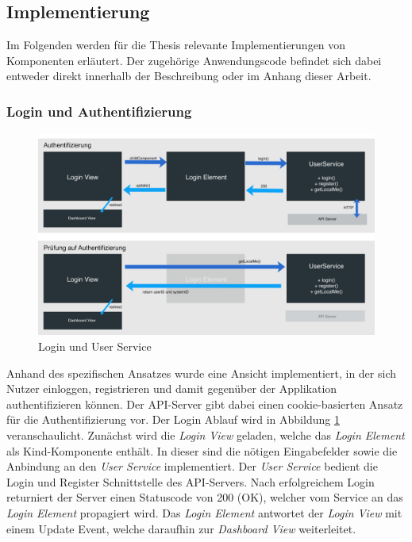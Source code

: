 \subsection{Implementierung}

Im Folgenden werden für die Thesis relevante Implementierungen von Komponenten erläutert.
Der zugehörige Anwendungscode befindet sich dabei entweder direkt innerhalb der Beschreibung oder im Anhang dieser Arbeit.

\subsubsection{Login und Authentifizierung}
\label{Login-und-Authentifikation}

\begin{figure}[hptb]
 \centering
 \includegraphics[width=\linewidth]{kapitel4/login.jpg}
 \caption{Login und User Service}
 \label{kapitel4/login}
\end{figure}
\vspace{0.3cm}

Anhand des spezifischen Ansatzes wurde eine Ansicht implementiert, in der sich Nutzer einloggen, registrieren und damit gegenüber der Applikation authentifizieren können.
Der \ac{API}-Server gibt dabei einen cookie-basierten Ansatz für die Authentifizierung vor. Der Login Ablauf wird in Abbildung \ref{kapitel4/login} veranschaulicht.
Zunächst wird die \emph{Login View} geladen, welche das \emph{Login Element} als Kind-Komponente enthält.
In dieser sind die nötigen Eingabefelder sowie die Anbindung an den \emph{User Service} implementiert.
Der \emph{User Service} bedient die Login und Register Schnittstelle des \ac{API}-Servers.
Nach erfolgreichem Login returniert der Server einen Statuscode von 200 (OK), welcher vom Service an das \emph{Login Element} propagiert wird.
Das \emph{Login Element} antwortet der \emph{Login View} mit einem Update Event, welche daraufhin zur \emph{Dashboard View} weiterleitet.


